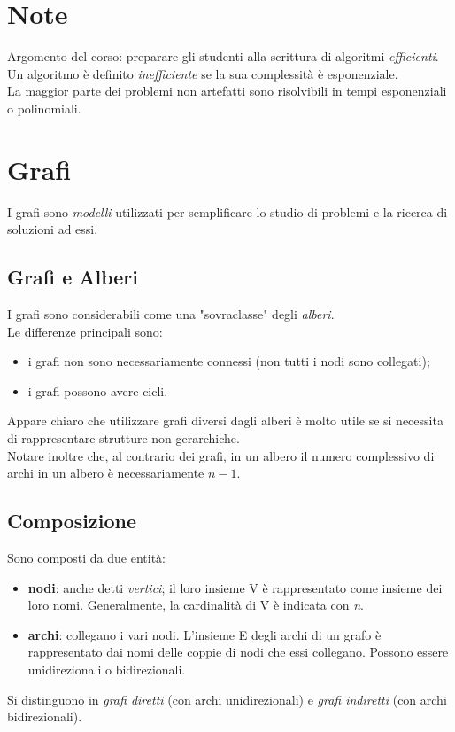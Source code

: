 \section{Note}
Argomento del corso: preparare gli studenti alla scrittura di algoritmi \textit{efficienti}.
Un algoritmo è definito \textit{inefficiente} se la sua complessità è esponenziale.\\
La maggior parte dei problemi non artefatti sono risolvibili in tempi esponenziali o polinomiali.

\section{Grafi}
I grafi sono \textit{modelli} utilizzati per semplificare lo studio di problemi e la ricerca di soluzioni ad essi.
\subsection{Grafi e Alberi}
I grafi sono considerabili come una "sovraclasse" degli \textit{alberi}.\\
Le differenze principali sono:
\begin{itemize}
	\item i grafi non sono necessariamente connessi (non tutti i nodi sono collegati);
	\item i grafi possono avere cicli.
	
\end{itemize}
Appare chiaro che utilizzare grafi diversi dagli alberi è molto utile se si necessita di rappresentare strutture non gerarchiche.\\
Notare inoltre che, al contrario dei grafi, in un albero il numero complessivo di archi in un albero è necessariamente $ n-1 $.


\subsection{Composizione}
Sono composti da due entità:
\begin{itemize}
	\item \textbf{nodi}: anche detti \textit{vertici}; il loro insieme V è rappresentato come insieme dei loro nomi. Generalmente, la cardinalità di V è indicata con \textit{n}.
	\item \textbf{archi}: collegano i vari nodi. L'insieme E degli archi di un grafo è rappresentato dai nomi delle coppie di nodi che essi collegano. Possono essere unidirezionali o bidirezionali.
\end{itemize}
Si distinguono in \textit{grafi diretti} (con archi unidirezionali) e \textit{grafi indiretti} (con archi bidirezionali).
